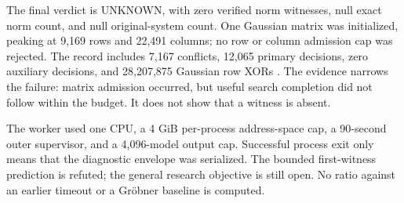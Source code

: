The final verdict is UNKNOWN, with zero verified norm witnesses, null exact
norm count, and null original-system count. One Gaussian matrix was
initialized, peaking at 9,169 rows and 22,491 columns; no row or column
admission cap was rejected. The record includes 7,167 conflicts,
12,065 primary decisions, zero auxiliary decisions, and 28,207,875 Gaussian
row XORs . The evidence narrows the failure: matrix admission occurred,
but useful search completion did not follow within the budget. It does not
show that a witness is absent.

The worker used one CPU, a 4 GiB per-process address-space cap, a 90-second
outer supervisor, and a 4,096-model output cap. Successful process exit only
means that the diagnostic envelope was serialized. The bounded first-witness
prediction is refuted; the general research objective is still open.
No ratio against an earlier timeout or a Gr\"obner baseline is computed.
